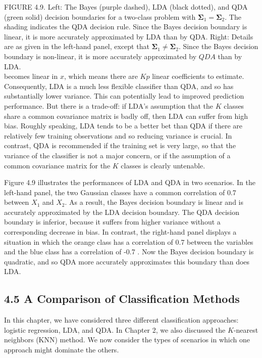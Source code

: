 \documentclass[10pt]{article}
\begin{document}
FIGURE 4.9. Left: The Bayes (purple dashed), LDA (black dotted), and QDA (green solid) decision boundaries for a two-class problem with $\boldsymbol{\Sigma}_{1}=\boldsymbol{\Sigma}_{2}$. The shading indicates the QDA decision rule. Since the Bayes decision boundary is linear, it is more accurately approximated by LDA than by QDA. Right: Details are as given in the left-hand panel, except that $\boldsymbol{\Sigma}_{1} \neq \boldsymbol{\Sigma}_{2}$. Since the Bayes decision boundary is non-linear, it is more accurately approximated by $Q D A$ than by LDA.\\
becomes linear in $x$, which means there are $K p$ linear coefficients to estimate. Consequently, LDA is a much less flexible classifier than QDA, and so has substantially lower variance. This can potentially lead to improved prediction performance. But there is a trade-off: if LDA's assumption that the $K$ classes share a common covariance matrix is badly off, then LDA can suffer from high bias. Roughly speaking, LDA tends to be a better bet than QDA if there are relatively few training observations and so reducing variance is crucial. In contrast, QDA is recommended if the training set is very large, so that the variance of the classifier is not a major concern, or if the assumption of a common covariance matrix for the $K$ classes is clearly untenable.

Figure 4.9 illustrates the performances of LDA and QDA in two scenarios. In the left-hand panel, the two Gaussian classes have a common correlation of 0.7 between $X_{1}$ and $X_{2}$. As a result, the Bayes decision boundary is linear and is accurately approximated by the LDA decision boundary. The QDA decision boundary is inferior, because it suffers from higher variance without a corresponding decrease in bias. In contrast, the right-hand panel displays a situation in which the orange class has a correlation of 0.7 between the variables and the blue class has a correlation of -0.7 . Now the Bayes decision boundary is quadratic, and so QDA more accurately approximates this boundary than does LDA.


\subsection*{4.5 A Comparison of Classification Methods}
In this chapter, we have considered three different classification approaches: logistic regression, LDA, and QDA. In Chapter 2, we also discussed the $K$-nearest neighbors (KNN) method. We now consider the types of scenarios in which one approach might dominate the others.
\end{document}
